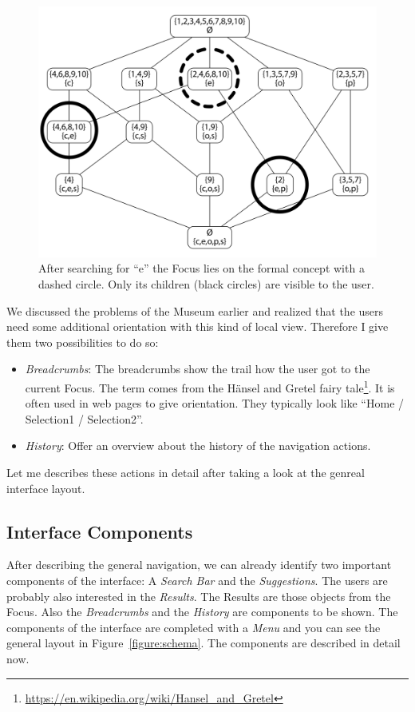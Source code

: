 \documentclass[11pt]{report}
\begin{document}
\begin{figure}[!ht]
	\centering
	\includegraphics[width=\linewidth]{images/focus}
\caption{After searching for ``e'' the Focus lies on the formal concept with a dashed circle. Only its children (black circles) are visible to the user. }
\label{figure:conceptExample}
\end{figure}

We discussed the problems of the Museum earlier and realized that the users need some additional orientation with this kind of local view. Therefore I give them two possibilities to do so:
\begin{itemize}
	\item \textit{Breadcrumbs}: The breadcrumbs show the trail how the user got to the current Focus. The term comes from the Hänsel and Gretel fairy tale\footnote{\url{https://en.wikipedia.org/wiki/Hansel_and_Gretel}}. It is often used in web pages to give orientation. They typically look like ``Home / Selection1 / Selection2''.
	\item \textit{History}: Offer an overview about the history of the navigation actions.
\end{itemize}

Let me describes these actions in detail after taking a look at the genreal interface layout.

\subsection{Interface Components}
After describing the general navigation, we can already identify two important components of the interface: A \textit{Search Bar} and the \textit{Suggestions}. The users are probably also interested in the \textit{Results}. The Results are those objects from the Focus. Also the \textit{Breadcrumbs} and the \textit{History} are components to be shown. The components of the interface are completed with a \textit{Menu} and you can see the general layout in Figure~\ref{figure:schema}. The components are described in detail now. \\
\end{document}
